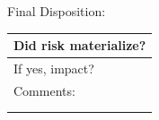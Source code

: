 \documentclass{article}
\begin{document}
Final Disposition:

\begin{tabular}{|p{433pt}|} \hline
Did risk materialize? \\ \hline
If yes, impact? \\ \hline
Comments: \\
\mbox{} \\
\mbox{} \\ \hline
\end{tabular}
\end{document}
